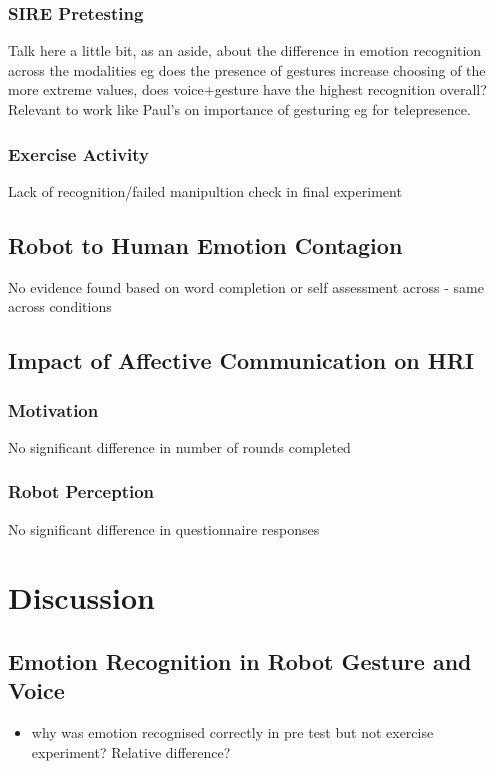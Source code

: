 \documentclass[11pt,a4paper]{report}
\begin{document}
\begin{itemize}
\subsection{SIRE Pretesting}
Talk here a little bit, as an aside, about the difference in emotion recognition across the modalities eg does the presence of gestures increase choosing of the more extreme values, does voice+gesture have the highest recognition overall? Relevant to work like Paul's on importance of gesturing eg for telepresence.

\subsection{Exercise Activity}
Lack of recognition/failed manipultion check in final experiment

\section{Robot to Human Emotion Contagion}
No evidence found based on word completion or self assessment across - same across conditions

\section{Impact of Affective Communication on HRI}

\subsection{Motivation}
No significant difference in number of rounds completed

\subsection{Robot Perception}
No significant difference in questionnaire responses

\chapter{Discussion}

\section{Emotion Recognition in Robot Gesture and Voice}
\begin{itemize}
	\item why was emotion recognised correctly in pre test but not exercise experiment? Relative difference?
\end{itemize}


\end{itemize}
\end{document}
